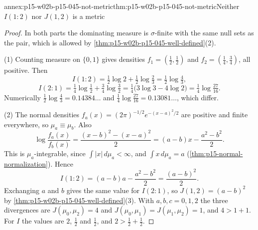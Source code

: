 \begin{annexitem}{annex:p15-w02b-p15-045-not-metric}{thm:p15-w02b-p15-045-not-metric}{Neither \(I(1:2)\) nor \(J(1,2)\) is a metric}
\begin{proof}
In both parts the dominating measure is \(\sigma\)-finite with the same
null sets as the pair, which is allowed by
\cref{thm:p15-w02b-p15-045-well-defined}(2).

(1) Counting measure on \(\{0,1\}\) gives densities
\(f_1=(\tfrac12,\tfrac12)\) and \(f_2=(\tfrac14,\tfrac34)\), all
positive. Then
\[
  I(1:2)=\tfrac12\log2+\tfrac12\log\tfrac23=\tfrac12\log\tfrac43,
\]
\[
  I(2:1)=\tfrac14\log\tfrac12+\tfrac34\log\tfrac32
        =\tfrac14\bigl(3\log3-4\log2\bigr)=\tfrac14\log\tfrac{27}{16}.
\]
Numerically \(\tfrac12\log\tfrac43=0.14384\ldots\) and
\(\tfrac14\log\tfrac{27}{16}=0.13081\ldots\), which differ.

(2) The normal densities \(f_a(x)=(2\pi)^{-1/2}e^{-(x-a)^2/2}\) are
positive and finite everywhere, so \(\mu_a\equiv\mu_b\). Also
\[
  \log\frac{f_a(x)}{f_b(x)}=\frac{(x-b)^2-(x-a)^2}2=(a-b)x-\frac{a^2-b^2}2 .
\]
This is \(\mu_a\)-integrable, since \(\int|x|\,d\mu_a<\infty\), and
\(\int x\,d\mu_a=a\) (\cref{thm:p15-normal-normalization}). Hence
\[
  I(1:2)=(a-b)a-\frac{a^2-b^2}2=\frac{(a-b)^2}2 .
\]
Exchanging \(a\) and \(b\) gives the same value for \(I(2:1)\), so
\(J(1,2)=(a-b)^2\) by \cref{thm:p15-w02b-p15-045-well-defined}(3). With
\(a,b,c=0,1,2\) the three divergences are \(J(\mu_0,\mu_2)=4\) and
\(J(\mu_0,\mu_1)=J(\mu_1,\mu_2)=1\), and \(4>1+1\). For \(I\) the
values are \(2\), \(\tfrac12\) and \(\tfrac12\), and \(2>\tfrac12+\tfrac12\).
\end{proof}
\end{annexitem}

